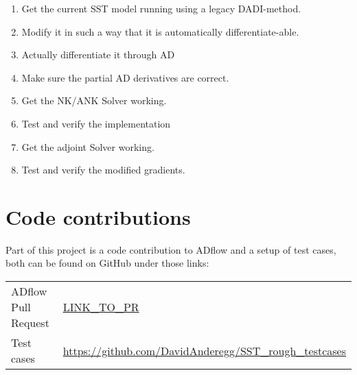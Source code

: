 \begin{enumerate}
    \item Get the current SST model running using a legacy DADI-method.

    \item Modify it in such a way that it is automatically differentiate-able.

    \item Actually differentiate it through AD

    \item Make sure the partial AD derivatives are correct. 

    \item Get the NK/ANK Solver working.

    \item Test and verify the implementation

    \item Get the adjoint Solver working.

    \item Test and verify the modified gradients.
\end{enumerate}




\section{Code contributions}
Part of this project is a code contribution to ADflow and a setup of test
cases, both can be found on GitHub under those links:\\

\begin{tabular}{l l}
  ADflow Pull Request & \url{LINK_TO_PR} \\
  Test cases & \url{https://github.com/DavidAnderegg/SST_rough_testcases}
\end{tabular}
